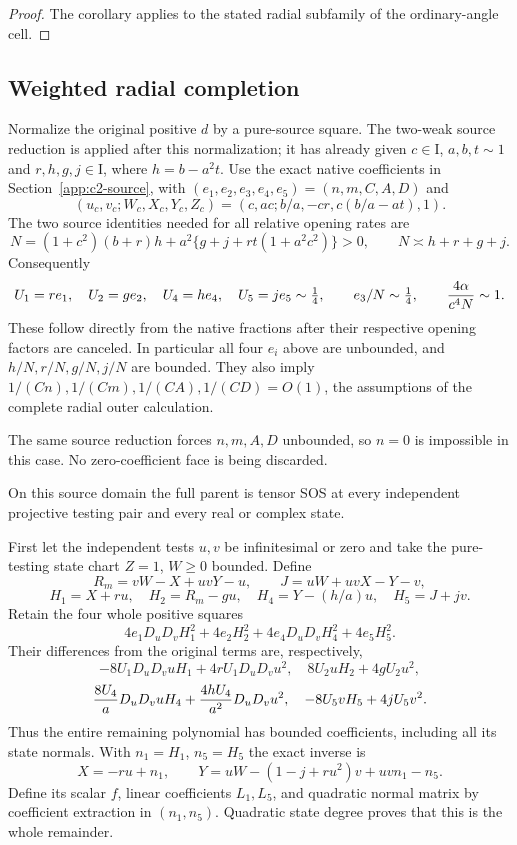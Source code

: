 \begin{proof}
The corollary applies to the stated radial subfamily of the ordinary-angle
cell.
\end{proof}

\subsection{Weighted radial completion}
\label{component:p9f1235511111}
\label{component:p53752031d16c}
\label{component:p163e0ebf59f6}
\label{p9f1235511111:sec:c2-unified}
\label{p53752031d16c:sec:c2-y-current}
\label{p163e0ebf59f6:sec:c2-radial-corner}
Normalize the original positive $d$ by a pure-source square. The
two-weak source reduction is applied after this normalization; it has
already given $c\in\mathrm I$,
$a,b,t\sim1$ and $r,h,g,j\in\mathrm I$, where $h=b-a^2t$.
Use the exact native coefficients in Section~\ref{app:c2-source}, with
$(e_1,e_2,e_3,e_4,e_5)=(n,m,C,A,D)$ and
\[
 (u_c,v_c;W_c,X_c,Y_c,Z_c)
 =(c,ac;b/a,-cr,c(b/a-at),1).
\]
The two source identities needed for all relative opening rates are
\begin{equation}
 N=(1+c^2)(b+r)h+a^2\{g+j+rt(1+a^2c^2)\}>0,
 \qquad N\asymp h+r+g+j.
 \label{p53752031d16c:eq:c2y-N-positive}
\end{equation}
Consequently
\[
 U_1=re_1,\quad U_2=ge_2,\quad U_4=he_4,\quad U_5=je_5
 \sim\tfrac14,\qquad e_3/N\sim\tfrac14,
 \qquad {4\alpha\over c^4N}\sim1.
\]
These follow directly from the native fractions after their respective
opening factors are canceled. In particular all four $e_i$ above are
unbounded, and $h/N,r/N,g/N,j/N$ are bounded. They also imply
$1/(Cn),1/(Cm),1/(CA),1/(CD)=O(1)$, the assumptions of the complete
radial outer calculation.

The same source reduction forces $n,m,A,D$ unbounded, so $n=0$ is
impossible in this case. No zero-coefficient face is being discarded.
\begin{proposition}
\label{prop:c2-weighted-radial}
\label{p163e0ebf59f6:thm:c2-radial-corner}
On this source domain the full parent is tensor SOS at every independent
projective testing pair and every real or complex state.
\end{proposition}
First let the independent tests $u,v$ be infinitesimal or zero and take
the pure-testing state chart $Z=1$, $W\ge0$ bounded. Define
\[
 R_m=vW-X+uvY-u,\qquad J=uW+uvX-Y-v,
\]
\[
 H_1=X+ru,\quad H_2=R_m-gu,\quad
 H_4=Y-(h/a)u,\quad H_5=J+jv.
\]
Retain the four whole positive squares
\[
 4e_1D_uD_vH_1^2+4e_2H_2^2+4e_4D_uD_vH_4^2+4e_5H_5^2.
\]
Their differences from the original terms are, respectively,
\[
 -8U_1D_uD_vuH_1+4rU_1D_uD_vu^2,
 \quad8U_2uH_2+4gU_2u^2,
\]
\[
 {8U_4\over a}D_uD_vuH_4+{4hU_4\over a^2}D_uD_vu^2,
 \quad-8U_5vH_5+4jU_5v^2.
\]
Thus the entire remaining polynomial has bounded coefficients,
including all its state normals. With $n_1=H_1$, $n_5=H_5$ the exact
inverse is
\[
 X=-ru+n_1,\qquad
 Y=uW-(1-j+ru^2)v+uvn_1-n_5.
\]
Define its scalar $f$, linear coefficients $L_1,L_5$, and quadratic
normal matrix by coefficient extraction in $(n_1,n_5)$. Quadratic
state degree proves that this is the whole remainder.

